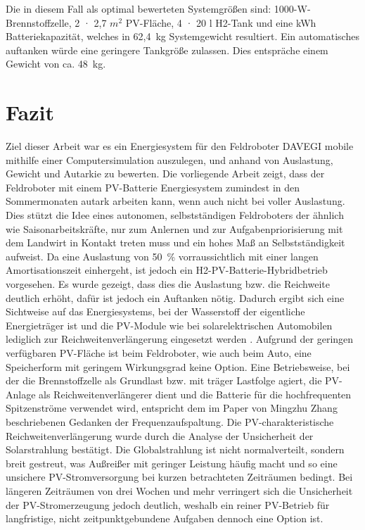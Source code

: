 Die in diesem Fall als optimal bewerteten Systemgrößen sind: 1000-W-Brennstoffzelle, 2 · 2,7 $m^{2}$
PV-Fläche, 4 · 20 l H2-Tank und eine kWh Batteriekapazität, welches in 62,4~kg Systemgewicht resultiert. Ein automatisches auftanken würde eine geringere Tankgröße zulassen. Dies entspräche einem Gewicht von ca. 48~kg.

\clearpage
\section{Fazit}
Ziel dieser Arbeit war es ein Energiesystem für den Feldroboter DAVEGI mobile mithilfe einer Computersimulation auszulegen, und anhand von Auslastung, Gewicht und Autarkie zu bewerten.
Die vorliegende Arbeit zeigt, dass der Feldroboter mit einem PV-Batterie Energiesystem zumindest in den Sommermonaten autark arbeiten kann, wenn auch nicht bei voller Auslastung. Dies stützt die Idee eines autonomen, selbstständigen Feldroboters der ähnlich wie Saisonarbeitskräfte, nur zum Anlernen und zur Aufgabenpriorisierung mit dem Landwirt in Kontakt treten muss und ein hohes Maß an Selbstständigkeit aufweist. Da eine Auslastung von 50~\% vorraussichtlich mit einer langen Amortisationszeit einhergeht, ist jedoch ein H2-PV-Batterie-Hybridbetrieb vorgesehen. Es wurde gezeigt, dass dies die Auslastung bzw. die Reichweite deutlich erhöht, dafür ist jedoch ein Auftanken nötig. Dadurch ergibt sich eine Sichtweise auf das Energiesystems, bei der Wasserstoff der eigentliche Energieträger ist und die PV-Module wie bei solarelektrischen Automobilen lediglich zur Reichweitenverlängerung eingesetzt werden \cite{oluwalana_solar-powered-cars_2025}. Aufgrund der geringen verfügbaren PV-Fläche ist beim Feldroboter, wie auch beim Auto, eine Speicherform mit geringem Wirkungsgrad keine Option. Eine Betriebsweise, bei der die Brennstoffzelle als Grundlast bzw. mit träger Lastfolge agiert, die PV-Anlage als Reichweitenverlängerer dient und die Batterie für die hochfrequenten Spitzenströme verwendet wird, entspricht dem im Paper von Mingzhu Zhang \cite{zhang_energy_2024} beschriebenen Gedanken der Frequenzaufspaltung. Die PV-charakteristische Reichweitenverlängerung wurde durch die Analyse der Unsicherheit der Solarstrahlung bestätigt. Die Globalstrahlung ist nicht normalverteilt, sondern breit gestreut, was Außreißer mit geringer Leistung häufig macht und so eine unsichere PV-Stromversorgung bei kurzen betrachteten Zeiträumen bedingt. Bei längeren Zeiträumen von drei Wochen und mehr verringert sich die Unsicherheit der PV-Stromerzeugung jedoch deutlich, weshalb ein reiner PV-Betrieb für langfristige, nicht zeitpunktgebundene Aufgaben dennoch eine Option ist. \\

